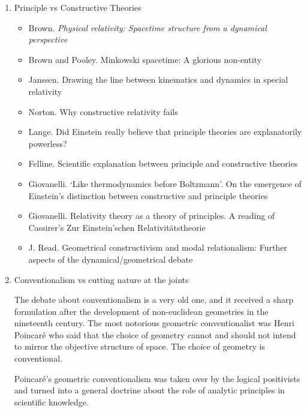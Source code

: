 \documentclass[11pt]{article}
\begin{document}
\begin{enumerate}
\item Principle vs Constructive Theories
  \begin{itemize}
  \item Brown. \emph{Physical relativity: Spacetime structure from a
      dynamical perspective}
  \item Brown and Pooley. Minkowski spacetime: A glorious non-entity
  \item Janssen. Drawing the line between kinematics and dynamics in
    special relativity
  \item Norton. Why constructive relativity fails
  \item Lange. Did Einstein really believe that principle theories are
    explanatorily powerless?
  \item Felline. Scientific explanation between principle and
    constructive theories
  \item Giovanelli. `Like thermodynamics before Boltzmann'. On the
    emergence of Einstein's distinction between constructive and
    principle theories
  \item Giovanelli. Relativity theory as a theory of principles. A
    reading of Cassirer's Zur Einstein'schen Relativitätstheorie
  \item J. Read. Geometrical constructivism and modal relationalism:
    Further aspects of the dynamical/geometrical debate
  \end{itemize}

\item Conventionalism vs cutting nature at the joints


  The debate about conventionalism is a very old one, and it received
  a sharp formulation after the development of non-euclidean
  geometries in the nineteenth century. The most notorious geometric
  conventionalist was Henri Poincar{\'e} who said that the choice of
  geometry cannot and should not intend to mirror the objective
  structure of space. The choice of geometry is conventional.

  Poincar{\'e}'s geometric conventionalism was taken over by the
  logical positivists and turned into a general doctrine about the
  role of analytic principles in scientific knowledge.


\end{enumerate}
\end{document}

